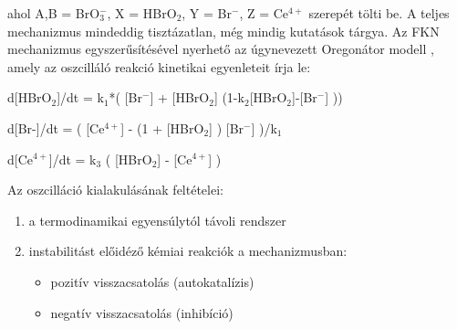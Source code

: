 ahol A,B = BrO$_3^-$, X = HBrO$_2$, Y = Br$^-$, Z = Ce$^{4+}$ szerepét tölti be. A teljes mechanizmus mindeddig tisztázatlan, még mindig kutatások tárgya. Az FKN mechanizmus egyszerűsítésével nyerhető az úgynevezett Oregonátor modell \cite{field1974oscillations}, amely az oszcilláló reakció kinetikai egyenleteit írja le:

\begin{center}
d[HBrO$_2$]/dt = k$_1$*( [Br$^-$] + [HBrO$_2$] (1-k$_2$[HBrO$_2$]-[Br$^-$] ))

d[Br-]/dt = ( [Ce$^{4+}$] - (1 + [HBrO$_2$] ) [Br$^-$] )/k$_1$

d[Ce$^{4+}$]/dt = k$_3$ ( [HBrO$_2$] - [Ce$^{4+}$] )
\end{center}



%
%
%
%
%

Az oszcilláció kialakulásának feltételei:
\begin{enumerate}
\item a termodinamikai egyensúlytól távoli rendszer
\item instabilitást előidéző kémiai reakciók a mechanizmusban:
 \begin{itemize}
\item pozitív visszacsatolás (autokatalízis)
\item negatív visszacsatolás (inhibíció)
\end{itemize}
\end{enumerate}

